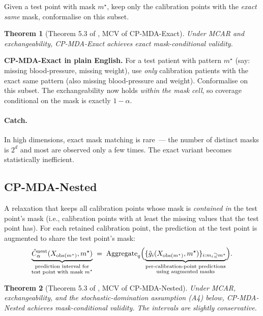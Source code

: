 \documentclass[letterpaper,11pt,leqno]{article}
\newtheorem*{thmstar}{Theorem}
\begin{document}
Given a test point with mask $m^{\star}$, keep only the calibration points with the \emph{exact same} mask, conformalise on this subset.

\begin{thmstar}[Theorem 5.3 of \cite{zaffran2024missing}, MCV of CP-MDA-Exact]
Under MCAR and exchangeability, CP-MDA-Exact achieves \emph{exact} mask-conditional validity.
\end{thmstar}

\begin{theoremexplain}
\textbf{CP-MDA-Exact in plain English.} For a test patient with pattern $m^{\star}$ (say: missing blood-pressure, missing weight), use \emph{only} calibration patients with the exact same pattern (also missing blood-pressure and weight). Conformalise on this subset. The exchangeability now holds \emph{within the mask cell}, so coverage conditional on the mask is exactly $1 - \alpha$.
\end{theoremexplain}

\paragraph{Catch.} In high dimensions, exact mask matching is rare~--- the number of distinct masks is $2^d$ and most are observed only a few times. The exact variant becomes statistically inefficient.

\subsection*{CP-MDA-Nested}

A relaxation that keeps all calibration points whose mask is \emph{contained in} the test point's mask (i.e., calibration points with at least the missing values that the test point has). For each retained calibration point, the prediction at the test point is augmented to share the test point's mask:
\begin{equation*}
\underbrace{\hat{C}_{\alpha}^{\text{nest}}(X_{\text{obs}(m^{\star})}, m^{\star})}_{\substack{\text{prediction interval for}\\\text{test point with mask } m^{\star}}}
\;=\;
\text{Aggregate}_q\Bigl(
\underbrace{\{\hat{g}_i(X_{\text{obs}(m^{\star})}, m^{\star})\}_{i : m_i \supseteq m^{\star}}}_{\substack{\text{per-calibration-point predictions}\\\text{using augmented masks}}}
\Bigr).
\end{equation*}

\begin{thmstar}[Theorem 5.3 of \cite{zaffran2024missing}, MCV of CP-MDA-Nested]
Under MCAR, exchangeability, and the \emph{stochastic-domination} assumption (A4) below, CP-MDA-Nested achieves mask-conditional validity. The intervals are slightly conservative.
\end{thmstar}
\end{document}
